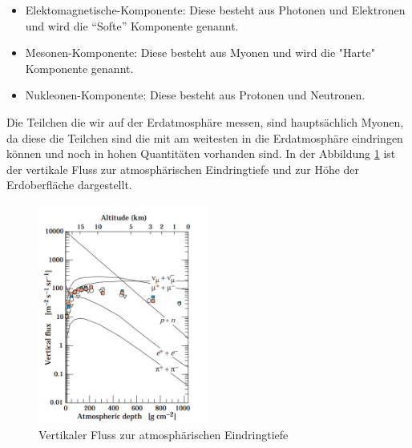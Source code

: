 \documentclass{article}
\begin{document}
\begin{itemize}
    \item Elektomagnetische-Komponente: Diese besteht aus Photonen und Elektronen und wird die \enquote{Softe} Komponente genannt.
    \item Mesonen-Komponente: Diese besteht aus Myonen und wird die "Harte" Komponente genannt.
    \item Nukleonen-Komponente: Diese besteht aus Protonen und Neutronen.
\end{itemize}
Die Teilchen die wir auf der Erdatmosphäre messen, sind hauptsächlich Myonen, da diese die Teilchen sind die mit am weitesten
in die Erdatmosphäre eindringen können und noch in hohen Quantitäten vorhanden sind.
In der Abbildung \ref{fig:Fluss} ist der vertikale Fluss zur atmosphärischen Eindringtiefe und zur Höhe der Erdoberfläche dargestellt.
\begin{figure}[H]
    \centering
    \includegraphics[width=0.5\textwidth]{figures/Fluss.png}
    \caption{Vertikaler Fluss zur atmosphärischen Eindringtiefe \cite{Naka}}
    \label{fig:Fluss}
\end{figure} 
\end{document}
